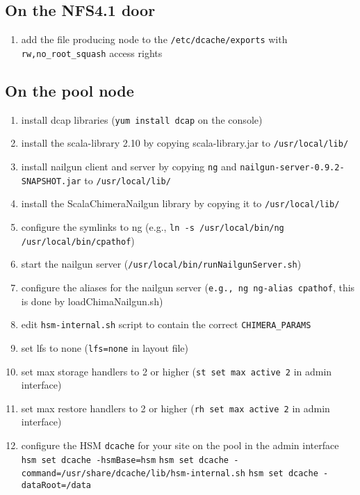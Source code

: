 \documentclass[a4paper,8pt]{scrartcl}
\begin{document}
\subsection{On the NFS4.1 door}
\begin{enumerate}
  \item add the file producing node to the \texttt{/etc/dcache/exports} with
    \texttt{rw,no\_root\_squash} access rights
\end{enumerate}

\subsection{On the pool node}
\begin{enumerate}
  \item install dcap libraries (\texttt{yum install dcap} on the console)
  \item install the scala-library 2.10 by copying scala-library.jar to \texttt{/usr/local/lib/}
  \item install nailgun client and server by copying \texttt{ng} and \texttt{nailgun-server-0.9.2-SNAPSHOT.jar} to \texttt{/usr/local/lib/}
  \item install the ScalaChimeraNailgun library by copying it to \texttt{/usr/local/lib/}
  \item configure the symlinks to ng (e.g., \texttt{ln -s /usr/local/bin/ng /usr/local/bin/cpathof})
  \item start the nailgun server (\texttt{/usr/local/bin/runNailgunServer.sh})
  \item configure the aliases for the nailgun server (\texttt{e.g., ng ng-alias cpathof}, this is done by loadChimaNailgun.sh)
  \item edit \texttt{hsm-internal.sh} script to contain the correct \texttt{CHIMERA\_PARAMS}
  \item set lfs to none (\texttt{lfs=none} in layout file)
  \item set max storage handlers to 2 or higher (\texttt{st set max active 2} in admin interface)
  \item set max restore handlers to 2 or higher (\texttt{rh set max active 2} in admin interface)
  \item configure the HSM \texttt{dcache} for your site on the pool in the admin interface
     \texttt{hsm set dcache -hsmBase=hsm}
     \texttt{hsm set dcache -command=/usr/share/dcache/lib/hsm-internal.sh}
     \texttt{hsm set dcache -dataRoot=/data}
\end{enumerate}
\end{document}
